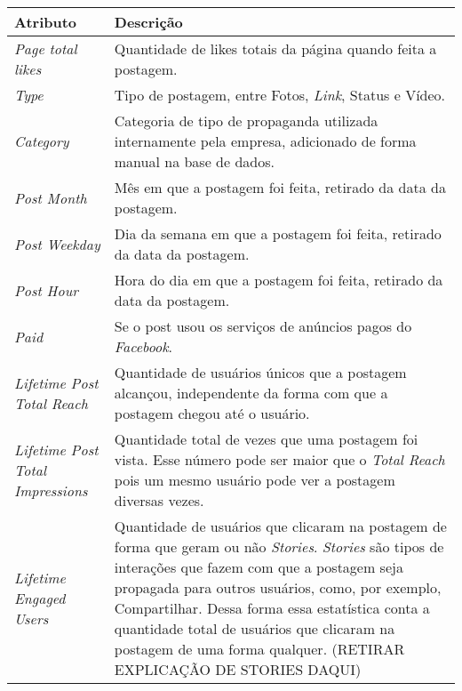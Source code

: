 

\begin{quadro}[!htb]
	\centering
	\caption{Descrição dos atributos da base de dados utilizada no trabalho.\label{qua:descBaseDados}}
	\small
	\begin{longtable}{|p{7cm}|p{7cm}|}
        		\hline
		\textbf{Atributo} & \textbf{Descrição} \\ \hline
		\textit{Page total likes} & Quantidade de likes totais da página quando feita a postagem. \\ \hline
		\textit{Type} & Tipo de postagem, entre Fotos, \textit{Link}, Status e Vídeo. \\ \hline
		\textit{Category} & Categoria de tipo de propaganda utilizada internamente pela empresa, adicionado de forma manual na base de dados. \\ \hline
		\textit{Post Month} & Mês em que a postagem foi feita, retirado da data da postagem. \\ \hline
		\textit{Post Weekday} & Dia da semana em que a postagem foi feita, retirado da data da postagem. \\ \hline
		\textit{Post Hour} & Hora do dia em que a postagem foi feita, retirado da data da postagem. \\ \hline
		\textit{Paid} & Se o post usou os serviços de anúncios pagos do \textit{Facebook}. \\ \hline
		\textit{Lifetime Post Total Reach} & Quantidade de usuários únicos que a postagem alcançou, independente da forma com que a postagem chegou até o usuário. \\ \hline
		\textit{Lifetime Post Total Impressions} & Quantidade total de vezes que uma postagem foi vista. Esse número pode ser maior que o \textit{Total Reach} pois um mesmo usuário pode ver a postagem diversas vezes. \\ \hline
		\textit{Lifetime Engaged Users} & Quantidade de usuários que clicaram na postagem de forma que geram ou não \textit{Stories}. \textit{Stories} são tipos de interações que fazem com que a postagem seja propagada para outros usuários, como, por exemplo, Compartilhar. Dessa forma essa estatística conta a quantidade total de usuários que clicaram na postagem de uma forma qualquer. (RETIRAR EXPLICAÇÃO DE STORIES DAQUI) \\ \hline

\end{longtable}
\end{quadro}
